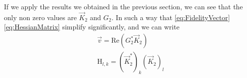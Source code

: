 If we apply the results we obtained in the previous section, we can see that the only non zero values are $ \vec{ K }_{2} $ and $ G_{2} $.
In such a way that \cref{eq:FidelityVector} \cref{eq:HessianMatrix} simplify significantly, and we can write
\begin{align}
    & \vec{v} = \text{Re}(G_{2}^{*}\vec{K}_{2}) \label{eq:FidelityVectorSimple} \\
    & \mathrm{H}_{l,k} = \left(  \vec{K}^{*}_{2} \right)_{k}\left(  \vec{K}_{2} \right)_{l} \label{eq:HessianMatrixSimple}
\end{align}


